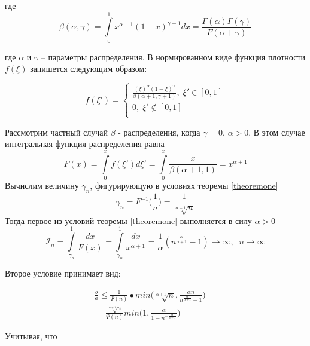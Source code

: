 \documentclass[a4paper, 14pt]{extarticle}
\numberwithin{equation}{section}
\begin{document}
где
\begin{equation*}
\beta(\alpha, \gamma) = \int\limits_0^1 x^{\alpha-1} (1-x)^{\gamma-1} dx = \frac{\Gamma(\alpha)\Gamma(\gamma)}{F(\alpha+\gamma)}
\end{equation*}

где $\alpha$ и $\gamma$ -- параметры распределения. В нормированном виде функция плотности $f(\xi)$ запишется следующим образом:

\begin{equation*}
f(\xi') = 
\begin{cases}
   \frac{(\xi)^\alpha (1-\xi)^\gamma}{ \beta(\alpha+1, \gamma+1)}, \;  \xi' \in [0,1]\\
   0, \;  \xi' \notin [0,1] \\
 \end{cases}
\end{equation*}

Рассмотрим частный случай $\beta$ - распределения, когда $\gamma=0$, $\alpha>0$. В этом случае интегральная функция распределения равна
\begin{equation*}
F(x) = \int\limits_0^x f(\xi')d\xi' = \int\limits_0^x \frac{x}{\beta(\alpha+1,1)} = x^{\alpha+1}
\end{equation*} 
Вычислим величину $\gamma_n$, фигурирующую в условиях теоремы \ref{theoremone}
\begin{equation*}
\gamma_n = F^{-1} \Big(\frac{1}{n} \Big) = \frac{1}{\sqrt[\alpha+1]{n}}
\end{equation*}
Тогда первое из условий теоремы \ref{theoremone} выполняется в силу $\alpha>0$
\begin{equation*}
\mathcal{I}_n = \int\limits_{\gamma_n}^1 \frac{dx}{F(x)} = \int\limits_{\gamma_n}^1 \frac{dx}{x^{\alpha+1}} = \frac{1}{\alpha} (n^{\frac{\alpha}{\alpha+1}}-1) \rightarrow \infty, \; \; n\rightarrow \infty
\end{equation*}

Второе условие принимает вид:

\begin{equation*}
\begin{aligned}
\frac{b}{a} \leqslant \frac{1}{\Psi(n)}•min \Big(\sqrt[\alpha+1]{n}, \frac{\alpha n}{n^{\frac{\alpha}{\alpha+1}}-1} \Big) = \\
=\frac{\sqrt[\alpha+1]{n}}{\Psi(n)} min \Big(1, \frac{\alpha}{1-n^{-\frac{\alpha}{\alpha+1}}} \Big)
\end{aligned}
\end{equation*}

Учитывая, что
\end{document}
